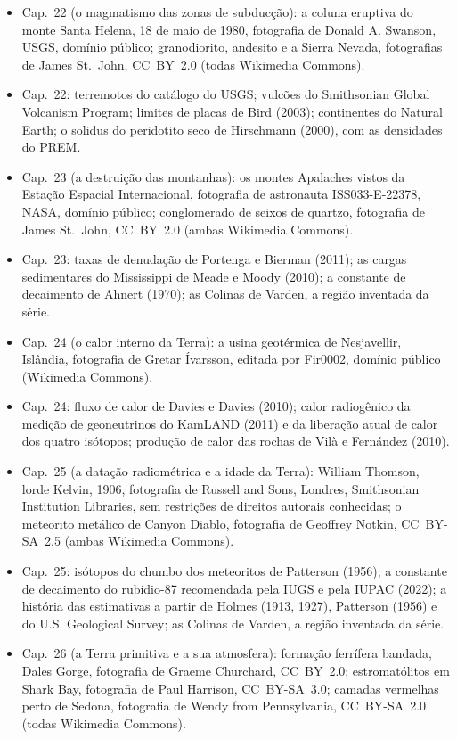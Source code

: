 \begin{itemize}
  \item Cap.~22 (o magmatismo das zonas de subducção): a coluna eruptiva do monte Santa Helena, 18 de maio de 1980, fotografia de Donald A. Swanson, USGS, domínio público; granodiorito, andesito e a Sierra Nevada, fotografias de James St.~John, CC~BY~2.0 (todas Wikimedia Commons).
  \item Cap.~22: terremotos do catálogo do USGS; vulcões do Smithsonian Global Volcanism Program; limites de placas de Bird (2003); continentes do Natural Earth; o solidus do peridotito seco de Hirschmann (2000), com as densidades do PREM.
  \item Cap.~23 (a destruição das montanhas): os montes Apalaches vistos da Estação Espacial Internacional, fotografia de astronauta ISS033-E-22378, NASA, domínio público; conglomerado de seixos de quartzo, fotografia de James St.~John, CC~BY~2.0 (ambas Wikimedia Commons).
  \item Cap.~23: taxas de denudação de Portenga e Bierman (2011); as cargas sedimentares do Mississippi de Meade e Moody (2010); a constante de decaimento de Ahnert (1970); as Colinas de Varden, a região inventada da série.
  \item Cap.~24 (o calor interno da Terra): a usina geotérmica de Nesjavellir, Islândia, fotografia de Gretar Ívarsson, editada por Fir0002, domínio público (Wikimedia Commons).
  \item Cap.~24: fluxo de calor de Davies e Davies (2010); calor radiogênico da medição de geoneutrinos do KamLAND (2011) e da liberação atual de calor dos quatro isótopos; produção de calor das rochas de Vilà e Fernández (2010).
  \item Cap.~25 (a datação radiométrica e a idade da Terra): William Thomson, lorde Kelvin, 1906, fotografia de Russell and Sons, Londres, Smithsonian Institution Libraries, sem restrições de direitos autorais conhecidas; o meteorito metálico de Canyon Diablo, fotografia de Geoffrey Notkin, CC~BY-SA~2.5 (ambas Wikimedia Commons).
  \item Cap.~25: isótopos do chumbo dos meteoritos de Patterson (1956); a constante de decaimento do rubídio-87 recomendada pela IUGS e pela IUPAC (2022); a história das estimativas a partir de Holmes (1913, 1927), Patterson (1956) e do U.S. Geological Survey; as Colinas de Varden, a região inventada da série.
  \item Cap.~26 (a Terra primitiva e a sua atmosfera): formação ferrífera bandada, Dales Gorge, fotografia de Graeme Churchard, CC~BY~2.0; estromatólitos em Shark Bay, fotografia de Paul Harrison, CC~BY-SA~3.0; camadas vermelhas perto de Sedona, fotografia de Wendy from Pennsylvania, CC~BY-SA~2.0 (todas Wikimedia Commons).

\end{itemize}
